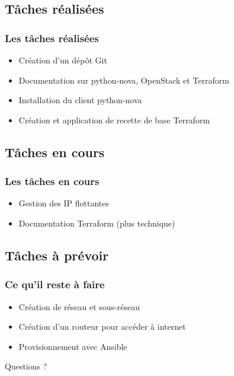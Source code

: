 \documentclass[11pt]{beamer} %
\begin{document}
	
		
		\subsection{Tâches réalisées}
			\begin{frame}
				\frametitle{Les tâches réalisées}
				\begin{itemize}
					\item Création d'un dépôt Git
					\item Documentation sur python-nova, OpenStack et Terraform
					\item Installation du client python-nova
					\item Création et application de recette de base Terraform
				\end{itemize}
			\end{frame}
		
		
		\subsection{Tâches en cours}
			\begin{frame}
				\frametitle{Les tâches en cours}
				\begin{itemize}
					\item Gestion des IP flottantes
					\item Documentation Terraform (plus technique)
				\end{itemize}
			\end{frame}
		
			
		
		\subsection{Tâches à prévoir}
			\begin{frame}
				\frametitle{Ce qu'il reste à faire}
				\begin{itemize}
					\item Création de réseau et sous-réseau
					\item Création d'un routeur pour accéder à internet
					\item Provisionnement avec Ansible
				\end{itemize}
			\end{frame}
			
			
			\begin{frame}
			\begin{center}
			\Huge{Questions ?}
			\end{center}
			\end{frame}
\end{document}
